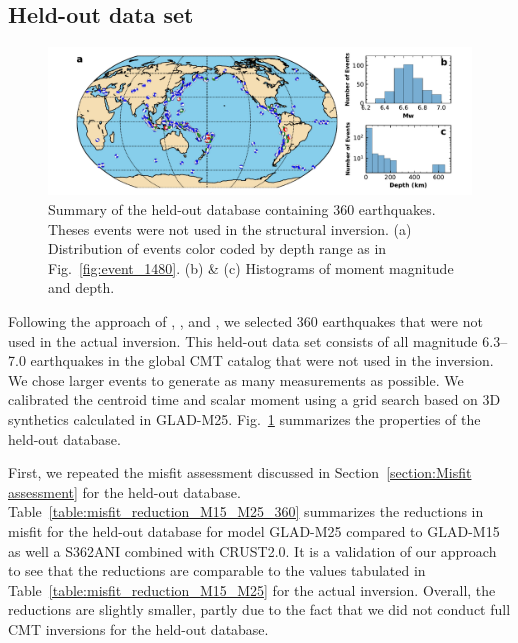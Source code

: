 \subsection{Held-out data set}

\begin{figure}
  \centering
  \includegraphics[width=\textwidth]{ch-GLADM25/figures/events_360.pdf}
  \caption[Distribution of 360 earthquakes used as held-out data]
  {\small{Summary of the held-out database containing 360 earthquakes. Theses events were not used in the structural inversion. (a) Distribution of events color coded by depth range as in Fig.~\ref{fig:event_1480}. (b) \& (c) Histograms of moment magnitude and depth.}}
  \label{fig:events_360}
\end{figure}

Following the approach of \cite{tape2009adjoint}, \cite{chen2015multiparameter},
and \cite{bozdaug2016global}, we selected 360 earthquakes that were not used
in the actual inversion. This held-out data set consists of all magnitude 6.3--7.0
earthquakes in the global CMT catalog that were not used in the inversion.
We chose larger events to generate as many measurements as possible.
We calibrated the centroid time and scalar moment using a grid search based on
3D synthetics calculated in GLAD-M25.
Fig.~\ref{fig:events_360} summarizes the properties of the held-out database.

First, we repeated the misfit assessment discussed in
Section~\ref{section:Misfit assessment} for the held-out database.
Table~\ref{table:misfit_reduction_M15_M25_360} summarizes the reductions
in misfit for the held-out database for model GLAD-M25 compared to GLAD-M15
as well a S362ANI combined with CRUST2.0.
It is a validation of our approach to see that the reductions are comparable to the
values tabulated in Table~\ref{table:misfit_reduction_M15_M25} for the actual inversion.
Overall, the reductions are slightly smaller, partly due to the fact that we did not
conduct full CMT inversions for the held-out database.

